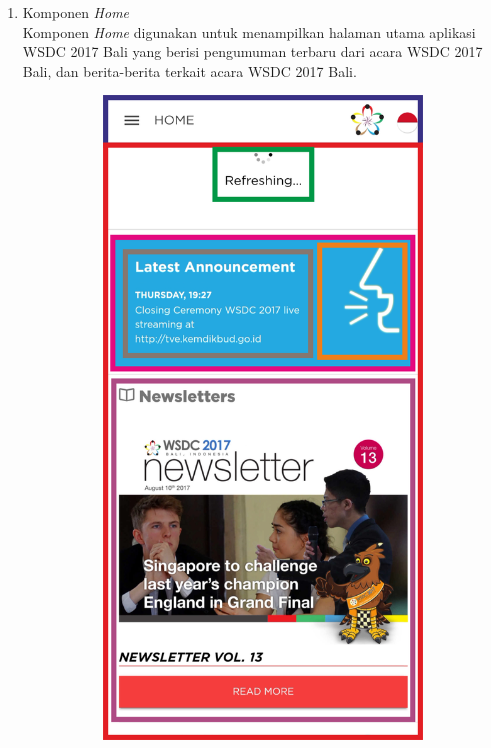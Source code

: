 \begin{enumerate}
	\item Komponen \textit{Home} \\
	Komponen \textit{Home} digunakan untuk menampilkan halaman utama aplikasi WSDC 2017 Bali yang berisi pengumuman terbaru dari acara WSDC 2017 Bali, dan berita-berita terkait acara WSDC 2017 Bali.
	\begin{figure}[H]
    	\centering
     	\begin{subfigure}[b]{0.43\textwidth}
        	\centering
         	\includegraphics[scale=0.465]{Gambar/HomePageWireframe.png}

\end{subfigure}
\end{figure}
\end{enumerate}
